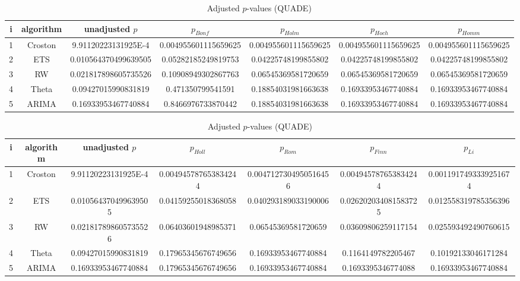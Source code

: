 \documentclass[a4paper,10pt]{article}
\begin{document}
\begin{landscape}
\begin{table}[!htp]
\centering\scriptsize
\caption{Adjusted $p$-values (QUADE)}
\begin{tabular}{ccccccc}
i&algorithm&unadjusted $p$&$p_{Bonf}$&$p_{Holm}$&$p_{Hoch}$&$p_{Homm}$\\
\hline
1&Croston&9.91120223131925E-4&0.004955601115659625&0.004955601115659625&0.004955601115659625&0.004955601115659625\\
2&ETS&0.010564370499639505&0.05282185249819753&0.04225748199855802&0.04225748199855802&0.04225748199855802\\
3&RW&0.021817898605735526&0.10908949302867763&0.06545369581720659&0.06545369581720659&0.06545369581720659\\
4&Theta&0.09427015990831819&0.471350799541591&0.18854031981663638&0.16933953467740884&0.16933953467740884\\
5&ARIMA&0.16933953467740884&0.8466976733870442&0.18854031981663638&0.16933953467740884&0.16933953467740884\\
\hline
\end{tabular}
\end{table}

\begin{table}[!htp]
\centering\scriptsize
\caption{Adjusted $p$-values (QUADE)}
\begin{tabular}{ccccccc}
i&algorithm&unadjusted $p$&$p_{Holl}$&$p_{Rom}$&$p_{Finn}$&$p_{Li}$\\
\hline
1&Croston&9.91120223131925E-4&0.004945787653834244&0.0047127304950516456&0.004945787653834244&0.0011917493339251674\\
2&ETS&0.010564370499639505&0.04159255018368058&0.040293189033190006&0.026202034081583725&0.012558319785356396\\
3&RW&0.021817898605735526&0.06403601948985371&0.06545369581720659&0.03609806259117154&0.025593492490760615\\
4&Theta&0.09427015990831819&0.17965345676749656&0.16933953467740884&0.1164149782205467&0.10192133046171284\\
5&ARIMA&0.16933953467740884&0.17965345676749656&0.16933953467740884&0.1693395346774088&0.16933953467740884\\
\hline
\end{tabular}
\end{table}

\end{landscape}
\end{document}

